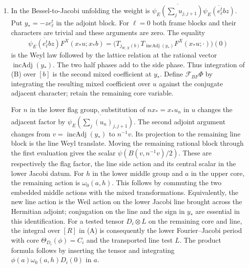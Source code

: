 \begin{enumerate}
\item In the Bessel-to-Jacobi unfolding the weight is
\(\overline{\psi_E(\sum_j u_{j,j+1})}
\overline{\psi_E(e_\ell^t b z)}\). Put
\(y_*=-z e_\ell^t\) in the adjoint block. For \(\ell=0\)
both frame blocks and their characters are trivial and these
arguments are zero. The equality
\[
 \overline{\psi_E(e_\ell^t b z)}F^X(x_*u;x_*b)
  =\bigl(T_{j_{W,X}(b)}T_{\operatorname{incAdj}(y_*)}
              F^X(x_*u;\cdot)\bigr)(0)
 \tag{B}
\]
is the Weyl law followed by the lattice relation at the rational
vector \(\operatorname{incAdj}(y_*)\). The two half phases
add to the side phase. Thus integration of (B) over \([b]\) is
the second mixed coefficient at \(y_*\). Define
\(\mathcal F_{BF}\Phi\) by integrating the resulting mixed
coefficient over \(u\) against the conjugate adjacent character;
retain the remaining core variable.

For \(n\) in the lower flag group, substitution of
\(n x_*=x_*u_n\) in \(u\) changes the adjacent factor by
\(\overline{\psi_E(\sum_j(u_n)_{j,j+1})}\). The second
adjoint argument changes from \(v=\operatorname{incAdj}(y_*)\)
to \(n^{-1}v\). Its projection to the remaining line block is
the line Weyl translate. Moving the remaining rational block
through the first evaluation gives the scalar
\(\psi(B(v,n^{-1}v)/2)\). These are respectively the
flag factor, the line side action and its central scalar in the
lower Jacobi datum. For \(h\) in the lower middle group and
\(a\) in the upper core, the remaining action is
\(\omega_0(a,h)\). This follows by commuting the two embedded
middle actions with the mixed transformations. Equivalently, the
new line action is the Weil action on the lower Jacobi line
brought across the Hermitian adjoint; conjugation on the line
and the sign in \(y_*\) are essential in this identification.
For a tested tensor \(D_i\otimes L\) on the remaining core
and line, the integral over \([R]\) in (A) is consequently the
lower Fourier--Jacobi period with core
\(\Theta_{D_i}(\phi)=C_i\) and the transported line test \(L\).
The product formula follows by inserting the tensor and
integrating \(\phi(a)\omega_0(a,h)D_i(0)\) in \(a\).


\end{enumerate}
